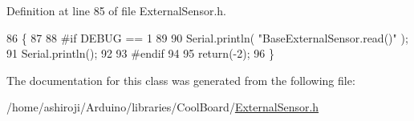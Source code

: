 Definition at line 85 of file External\+Sensor.\+h.


\begin{DoxyCode}
86     \{
87     
88 \textcolor{preprocessor}{    #if DEBUG == 1 }
89 
90         Serial.println( \textcolor{stringliteral}{"BaseExternalSensor.read()"} );
91         Serial.println();
92     
93 \textcolor{preprocessor}{    #endif      }
94         
95         \textcolor{keywordflow}{return}(-2);
96     \}
\end{DoxyCode}


The documentation for this class was generated from the following file\+:\begin{DoxyCompactItemize}
\item 
/home/ashiroji/\+Arduino/libraries/\+Cool\+Board/\hyperlink{ExternalSensor_8h}{External\+Sensor.\+h}\end{DoxyCompactItemize}
